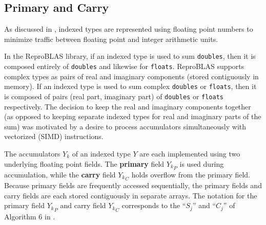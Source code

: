     \subsection{Primary and Carry}
      \label{sec:indexed_primary_carry}
      As discussed in \cite{repsum}, indexed types are represented using
      floating point numbers to minimize traffic between floating point and
      integer arithmetic units.

      In the ReproBLAS library, if an indexed type is used to sum
      \texttt{doubles}, then it is composed entirely of \texttt{doubles} and
      likewise for \texttt{floats}. ReproBLAS supports complex types as pairs
      of real and imaginary components (stored contiguously in memory). If an
      indexed type is used to sum complex \texttt{doubles} or \texttt{floats},
      then it is composed of pairs (real part, imaginary part) of
      \texttt{doubles} or \texttt{floats} respectively. The decision to keep
      the real and imaginary components together (as opposed to keeping
      separate indexed types for real and imaginary parts of the sum) was
      motivated by a desire to process accumulators simultaneously with
      vectorized (SIMD) instructions.

      The accumulators $Y_k$ of an indexed type $Y$ are each implemented using
      two underlying floating point fields. The \textbf{primary} field
      ${Y_k}_P$ is used during accumulation, while the \textbf{carry} field
      ${Y_k}_C$ holds overflow from the primary field. Because primary fields
      are frequently accessed sequentially, the primary fields and carry fields
      are each stored contiguously in separate arrays. The notation for the
      primary field ${Y_k}_P$ and carry field ${Y_k}_C$ corresponds to the
      ``$S_j$'' and ``$C_j$'' of Algorithm $6$ in \cite{repsum}.

